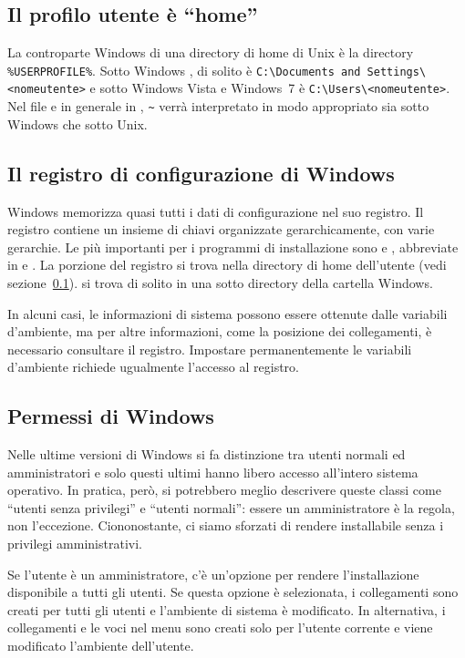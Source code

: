 \documentclass{article}
\begin{document}
\subsection{Il profilo utente è ``home''}
\label{sec:winhome}

La controparte Windows di una directory di home di Unix è la directory
\verb|%USERPROFILE%|. Sotto Windows , di solito
è \verb|C:\Documents and Settings\<nomeutente>| e sotto Windows Vista e
Windows~7 è \verb|C:\Users\<nomeutente>|. Nel file  e in
generale in \KPS{}, \verb|~| verrà interpretato in modo appropriato sia
sotto Windows che sotto Unix.


\subsection{Il registro di configurazione di Windows}
\label{sec:registry}

Windows memorizza quasi tutti i dati di configurazione nel suo registro.
Il registro contiene un insieme di chiavi organizzate gerarchicamente,
con varie gerarchie. Le più importanti per i programmi di installazione
sono  e , abbreviate in
 e . La porzione  del registro si trova
nella directory di home dell'utente (vedi sezione~\ref{sec:winhome}).
 si trova di solito in una sotto directory della cartella
Windows.

In alcuni casi, le informazioni di sistema possono essere ottenute dalle
variabili d'ambiente, ma per altre informazioni, come la posizione dei
collegamenti, è necessario consultare il registro. Impostare
permanentemente le variabili d'ambiente richiede ugualmente l'accesso al
registro.


\subsection{Permessi di Windows}
\label{sec:winpermissions}

Nelle ultime versioni di Windows si fa distinzione tra utenti normali ed
amministratori e solo questi ultimi hanno libero accesso all'intero
sistema operativo. In pratica, però, si potrebbero meglio descrivere
queste classi come ``utenti senza privilegi'' e ``utenti normali'': essere
un amministratore è la regola, non l'eccezione. Ciononostante, ci siamo
sforzati di rendere \TL{} installabile senza i privilegi amministrativi.

Se l'utente è un amministratore, c'è un'opzione per rendere
l'installazione disponibile a tutti gli utenti. Se questa opzione è
selezionata, i collegamenti sono creati per tutti gli utenti e l'ambiente
di sistema è modificato. In alternativa, i collegamenti e le voci nel menu
sono creati solo per l'utente corrente e viene modificato l'ambiente
dell'utente.
\end{document}
